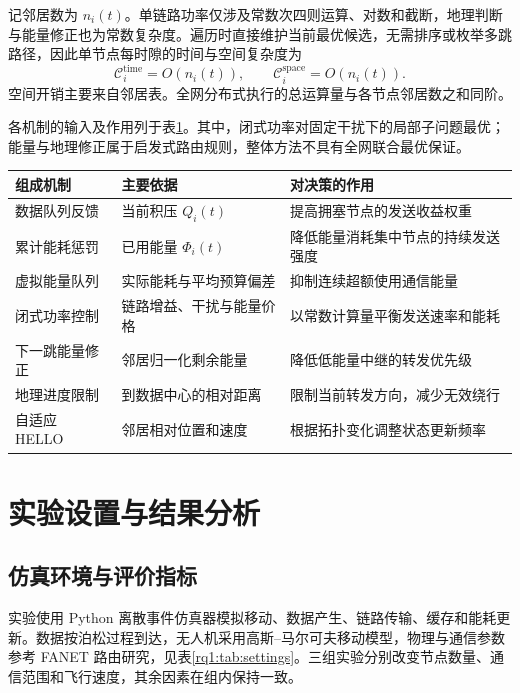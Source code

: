 记邻居数为 $n_i(t)$。单链路功率仅涉及常数次四则运算、对数和截断，地理判断与能量修正也为常数复杂度。遍历时直接维护当前最优候选，无需排序或枚举多跳路径，因此单节点每时隙的时间与空间复杂度为
\begin{equation}
 \mathcal{C}_{i}^{\mathrm{time}}=O(n_i(t)),\qquad
 \mathcal{C}_{i}^{\mathrm{space}}=O(n_i(t)).
 \label{rq1:eq:complexity}
\end{equation}
空间开销主要来自邻居表。全网分布式执行的总运算量与各节点邻居数之和同阶。

各机制的输入及作用列于表\ref{rq1:tab:components}。其中，闭式功率对固定干扰下的局部子问题最优；能量与地理修正属于启发式路由规则，整体方法不具有全网联合最优保证。

\begin{table}[!htbp]
\centering\small
{}
\label{rq1:tab:components}
\begin{tabularx}{\textwidth}{p{}p{}X}
\toprule
组成机制 & 主要依据 & 对决策的作用 \\
\midrule
数据队列反馈 & 当前积压 $Q_i(t)$ & 提高拥塞节点的发送收益权重 \\
累计能耗惩罚 & 已用能量 $\Phi_i(t)$ & 降低能量消耗集中节点的持续发送强度 \\
虚拟能量队列 & 实际能耗与平均预算偏差 & 抑制连续超额使用通信能量 \\
闭式功率控制 & 链路增益、干扰与能量价格 & 以常数计算量平衡发送速率和能耗 \\
下一跳能量修正 & 邻居归一化剩余能量 & 降低低能量中继的转发优先级 \\
地理进度限制 & 到数据中心的相对距离 & 限制当前转发方向，减少无效绕行 \\
自适应 HELLO & 邻居相对位置和速度 & 根据拓扑变化调整状态更新频率 \\
\bottomrule
\end{tabularx}
\end{table}

\section{实验设置与结果分析}
\label{rq1:sec:experiments}

\subsection{仿真环境与评价指标}

实验使用 Python 离散事件仿真器模拟移动、数据产生、链路传输、缓存和能耗更新。数据按泊松过程到达，无人机采用高斯--马尔可夫移动模型，物理与通信参数参考 FANET 路由研究\cite{qtar,drlfr}，见表\ref{rq1:tab:settings}。三组实验分别改变节点数量、通信范围和飞行速度，其余因素在组内保持一致。

